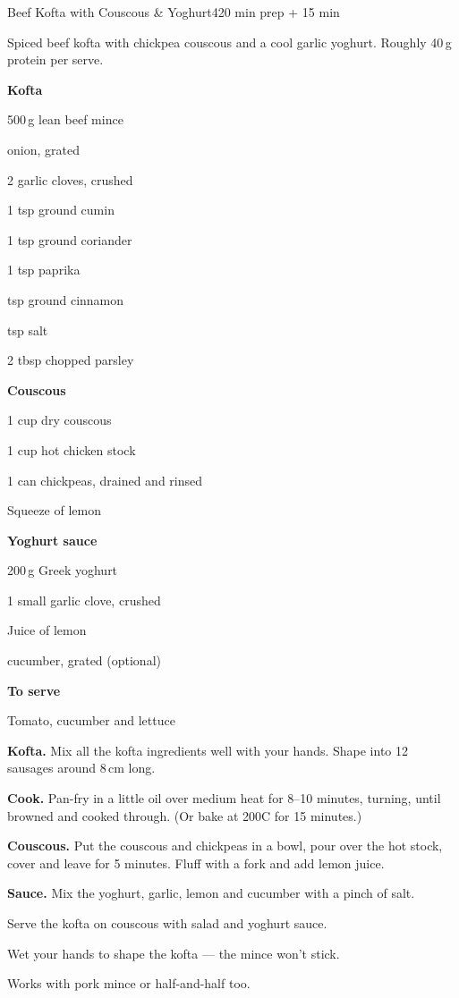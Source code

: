 \begin{recipebox}{Beef Kofta with Couscous \& Yoghurt}{4}{20 min prep + 15 min}

Spiced beef kofta with chickpea couscous and a cool garlic yoghurt.
Roughly 40\,g protein per serve.

\begin{ingredients}
  \item[] \textbf{Kofta}
  \item 500\,g lean beef mince
  \item {} onion, grated
  \item 2 garlic cloves, crushed
  \item 1 tsp ground cumin
  \item 1 tsp ground coriander
  \item 1 tsp paprika
  \item {} tsp ground cinnamon
  \item {} tsp salt
  \item 2 tbsp chopped parsley
  \item[] \textbf{Couscous}
  \item 1 cup dry couscous
  \item 1 cup hot chicken stock
  \item 1 can chickpeas, drained and rinsed
  \item Squeeze of lemon
  \item[] \textbf{Yoghurt sauce}
  \item 200\,g Greek yoghurt
  \item 1 small garlic clove, crushed
  \item Juice of  lemon
  \item {} cucumber, grated (optional)
  \item[] \textbf{To serve}
  \item Tomato, cucumber and lettuce
\end{ingredients}

\begin{method}
  \item \textbf{Kofta.} Mix all the kofta ingredients well with your hands. Shape into 12 sausages around 8\,cm long.
  \item \textbf{Cook.} Pan-fry in a little oil over medium heat for 8--10 minutes, turning, until browned and cooked through. (Or bake at 200\degree C for 15 minutes.)
  \item \textbf{Couscous.} Put the couscous and chickpeas in a bowl, pour over the hot stock, cover and leave for 5 minutes. Fluff with a fork and add lemon juice.
  \item \textbf{Sauce.} Mix the yoghurt, garlic, lemon and cucumber with a pinch of salt.
  \item Serve the kofta on couscous with salad and yoghurt sauce.
\end{method}

\begin{notelist}
  \item Wet your hands to shape the kofta --- the mince won't stick.
  \item Works with pork mince or half-and-half too.
\end{notelist}

\end{recipebox}
